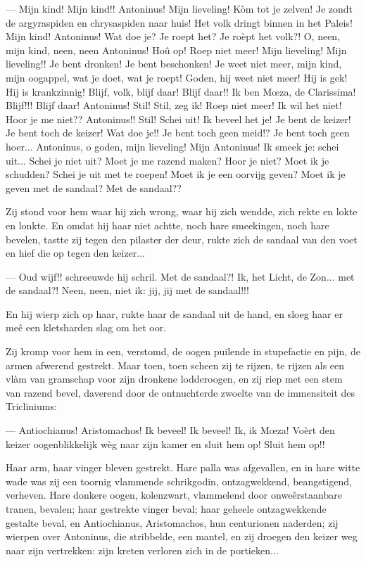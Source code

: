 \documentclass[a4paper, 12pt, oneside, dutch]{article}
\begin{document}
--- Mijn kind! Mijn kind!! Antoninus! Mijn lieveling! Kòm tot je zelven! Je zondt de argyraspiden en chrysaspiden naar huis! Het volk dringt binnen in het Paleis! Mijn kind! Antoninus! Wat doe je? Je roept het? Je roèpt het volk?! O, neen, mijn kind, neen, neen Antoninus! Hoû op! Roep niet meer! Mijn lieveling! Mijn lieveling!! Je bent dronken! Je bent beschonken! Je weet niet meer, mijn kind, mijn oogappel, wat je doet, wat je roept! Goden, hij weet niet meer! Hij is gek! Hij is krankzinnig! Blijf, volk, blijf daar! Blijf daar!! Ik ben Mœza, de Clarissima! Blijf!!! Blijf daar! Antoninus! Stil! Stil, zeg ik! Roep niet meer! Ik wil het niet! Hoor je me niet?? Antoninus!! Stil! Schei uit! Ik beveel het je! Je bent de keizer! Je bent toch de keizer! Wat doe je!! Je bent toch geen meid!? Je bent toch geen hoer... Antoninus, o goden, mijn lieveling! Mijn Antoninus! Ik smeek je: schei uit... Schei je niet uit? Moet je me razend maken? Hoor je niet? Moet ik je schudden? Schei je uit met te roepen! Moet ik je een oorvijg geven? Moet ik je geven met de sandaal? Met de sandaal??

Zij stond voor hem waar hij zich wrong, waar hij zich wendde, zich rekte en lokte en lonkte. En omdat hij haar niet achtte, noch hare smeekingen, noch hare bevelen, tastte zij tegen den pilaster der deur, rukte zich de sandaal van den voet en hief die op tegen den keizer...

--- Oud wijf!! schreeuwde hij schril. Met de sandaal?! Ik, het Licht, de Zon... met de sandaal?! Neen, neen, niet ik: jij, jij met de sandaal!!!

En hij wierp zich op haar, rukte haar de sandaal uit de hand, en sloeg haar er meê een kletsharden slag om het oor.

Zij kromp voor hem in een, verstomd, de oogen puilende in stupefactie en pijn, de armen afwerend gestrekt. Maar toen, toen scheen zij te rijzen, te rijzen als een vlàm van gramschap voor zijn dronkene lodderoogen, en zij riep met een stem van razend bevel, daverend door de ontnuchterde zwoelte van de immensiteit des Tricliniums:

--- Antiochianus! Aristomachos! Ik beveel! Ik beveel! Ik, ik Mœza! Voèrt den keizer oogenblikkelijk wèg naar zijn kamer en sluit hem op! Sluit hem op!!

Haar arm, haar vinger bleven gestrekt. Hare palla was afgevallen, en in hare witte wade was zij een toornig vlammende schrikgodin, ontzagwekkend, beangstigend, verheven. Hare donkere oogen, kolenzwart, vlammelend door onweêrstaanbare tranen, bevalen; haar gestrekte vinger beval; haar geheele ontzagwekkende gestalte beval, en Antiochianus, Aristomachos, hun centurionen naderden; zij wierpen over Antoninus, die stribbelde, een mantel, en zij droegen den keizer weg naar zijn vertrekken: zijn kreten verloren zich in de portieken...
\end{document}
